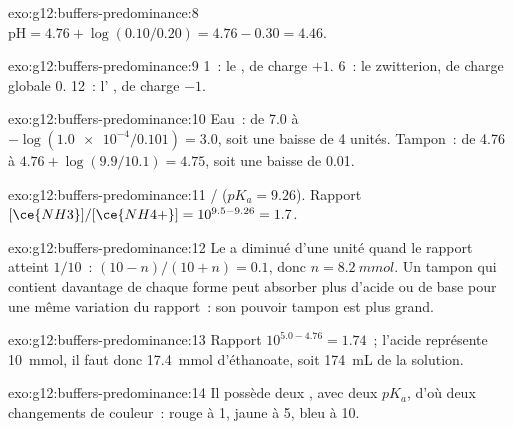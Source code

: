 \begin{solution}{exo:g12:buffers-predominance:8}
$\mathrm{pH} = 4.76 + \log(0.10/0.20) = 4.76 - 0.30 = 4.46$.
\end{solution}

\begin{solution}{exo:g12:buffers-predominance:9}
 1~: le  , de charge $+1$.  6~: le
zwitterion, de charge globale 0.  12~: l' , de
charge $-1$.
\end{solution}

\begin{solution}{exo:g12:buffers-predominance:10}
Eau~: de 7.0 à $-\log(\num{1.0e-4}/0.101) = 3.0$, soit une baisse de 4
unités.
Tampon~: de 4.76 à $4.76 + \log(9.9/10.1) = 4.75$, soit une baisse de
0.01.
\end{solution}

\begin{solution}{exo:g12:buffers-predominance:11}
/ ($pK_a = 9.26$). Rapport
$[\ce{NH3}]/[\ce{NH4+}] = 10^{9.5 - 9.26} = 1.7$.
\end{solution}

\begin{solution}{exo:g12:buffers-predominance:12}
Le  a diminué d'une unité quand le rapport atteint $1/10$~:
$(10 - n)/(10 + n) = 0.1$, donc $n = \qty{8.2}{mmol}$. Un tampon qui
contient davantage de chaque forme peut absorber plus d'acide ou de base
pour une même variation du rapport~: son pouvoir tampon est plus grand.
\end{solution}

\begin{solution}{exo:g12:buffers-predominance:13}
Rapport $10^{5.0 - 4.76} = 1.74$~; l'acide représente \qty{10}{mmol},
il faut donc
\qty{17.4}{mmol} d'éthanoate, soit \qty{174}{mL} de la solution.
\end{solution}

\begin{solution}{exo:g12:buffers-predominance:14}
Il possède deux , avec deux $pK_a$, d'où deux
changements de couleur~: rouge à  1, jaune à  5, bleu à  10.
\end{solution}


